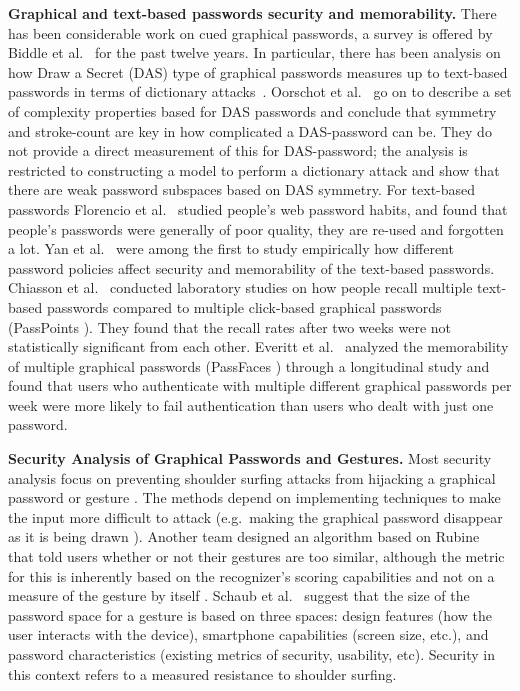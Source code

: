 \documentclass{sig-alternate-10pt}
\begin{document}
\textbf{Graphical and text-based passwords security and memorability.} There has been considerable work on cued graphical passwords, a survey is offered by Biddle et al.~\cite{Biddle:2012:GPL:2333112.2333114} for the past twelve years.
In particular, there has been analysis on how Draw a Secret (DAS) \cite{Jermyn:1999:DAG:1251421.1251422} type of graphical passwords measures up to text-based passwords in terms of dictionary attacks~\cite{Oorschot:2008:PMU:1284680.1284685}. Oorschot et al.~\cite{Oorschot:2008:PMU:1284680.1284685} go on to describe a set of complexity properties based for DAS passwords  and conclude that symmetry and stroke-count are key in how complicated a DAS-password can be. They do not provide a direct measurement of this for DAS-password; the analysis is restricted to constructing a model to perform a dictionary attack and show that there are weak password subspaces based on DAS symmetry. For text-based passwords Florencio et al.~\cite{Florencio:2007:LSW:1242572.1242661} studied people's web password habits, and found that people's passwords were generally of poor quality, they are re-used and forgotten a lot.  Yan et al.~\cite{Yan:2004:PMS:1024867.1025014} were among the first to study empirically how different password policies affect security and memorability of the text-based passwords. Chiasson et al.~\cite{Chiasson:2009:MPI:1653662.1653722} conducted laboratory studies on how people recall multiple text-based passwords compared to multiple click-based graphical passwords (PassPoints \cite{Wiedenbeck:2005:PDL:1090412.1090418}). They found that the recall rates after two weeks were not statistically significant from each other.  Everitt et al.~\cite{Everitt:2009:CSF:1518701.1518837} analyzed the memorability of multiple graphical passwords (PassFaces \cite{Biddle:2012:GPL:2333112.2333114}) through a longitudinal study and found that users who authenticate with multiple different graphical passwords per week were more likely to fail authentication than users who dealt with just one password. 

\textbf{Security Analysis of Graphical Passwords and Gestures.} Most security analysis focus on preventing shoulder surfing attacks from hijacking a graphical password or gesture \cite{Zakaria:2011:SSD:2078827.2078835,Schaub:2013:EDS:2501604.2501615,DeLuca:2013:BAS:2470654.2481330}. The methods depend on implementing techniques to make the input more difficult to attack (e.g.~making the graphical password disappear as it is being drawn \cite{Zakaria:2011:SSD:2078827.2078835}). Another team designed an algorithm based on Rubine~\cite{Rubine:1991:SGE:122718.122753} that told users whether or not their gestures are too similar, although the metric for this is inherently based on the recognizer's scoring capabilities and not on a measure of the gesture by itself \cite{Long:2001:LSI:971478.971510}.  Schaub et al.~\cite{Schaub:2013:EDS:2501604.2501615} suggest that the size of the password space for a gesture is based on three spaces: design features (how the user interacts with the device), smartphone capabilities (screen size, etc.), and password characteristics (existing metrics of security, usability, etc). Security in this context refers to a measured resistance to shoulder surfing. 
\end{document}
